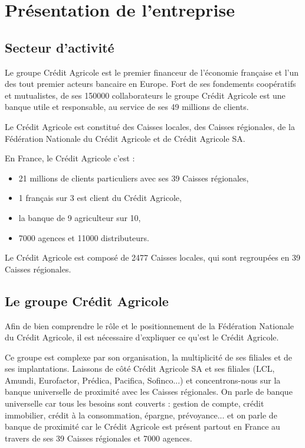 \documentclass[12pt,a4paper]{article}
\begin{document}
\newpage

\section{Présentation de l'entreprise}
\subsection{Secteur d'activité}
Le groupe Crédit Agricole est le  premier financeur de l'économie française et l'un des tout premier acteurs bancaire en Europe. Fort de ses fondements coopératifs et mutualistes, de ses 150000 collaborateurs le groupe Crédit Agricole est une banque utile et responsable, au service de ses 49 millions de clients.\par 
Le Crédit Agricole est constitué des Caisses locales, des Caisses régionales, de la Fédération Nationale du Crédit Agricole et de Crédit Agricole SA.\par
\bigskip
En France, le Crédit Agricole c'est :
\begin{itemize}
\item 21 millions de clients particuliers avec ses 39 Caisses régionales,
\item 1 français sur 3 est client du Crédit Agricole,
\item la banque de 9 agriculteur sur 10,
\item 7000 agences et 11000 distributeurs.
\end{itemize}\par
Le Crédit Agricole est composé de 2477 Caisses locales, qui sont regroupées en 39 Caisses régionales.\par

\subsection{Le groupe Crédit Agricole}
Afin de bien comprendre le rôle et le positionnement de la Fédération Nationale du Crédit Agricole, il est nécessaire d'expliquer ce qu'est le Crédit Agricole.\par
Ce groupe est complexe par son organisation, la multiplicité de ses filiales et de ses implantations.
Laissons de côté Crédit Agricole SA et ses filiales (LCL, Amundi, Eurofactor, Prédica, Pacifica, Sofinco...) et concentrons-nous sur la banque universelle de proximité avec les Caisses régionales.
On parle de banque universelle car tous les besoins sont couverts : gestion de compte, crédit immobilier, crédit à la consommation, épargne, prévoyance... et on parle de banque de proximité car le Crédit Agricole est présent partout en France au travers de ses 39 Caisses régionales et 7000 agences. \par
\end{document}
